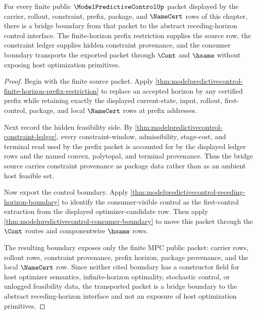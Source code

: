 \begin{theorem}
\label{thm:modelpredictivecontrol-finite-rollout-bridge-boundary}
For every finite public $\ModelPredictiveControlUp$ packet displayed by the
carrier, rollout, constraint, prefix, package, and $\NameCert$ rows of this
chapter, there is a bridge boundary from that packet to the abstract
receding-horizon control interface. The finite-horizon prefix restriction
supplies the source row, the constraint ledger supplies hidden constraint
provenance, and the consumer boundary transports the exported packet through
$\Cont$ and $\hsame$ without exposing host optimization primitives.
\end{theorem}
\begin{proof}
Begin with the finite source packet. Apply
\autoref{thm:modelpredictivecontrol-finite-horizon-prefix-restriction} to
replace an accepted horizon by any certified prefix while retaining exactly the
displayed current-state, input, rollout, first-control, package, and local
$\NameCert$ rows at prefix addresses.

Next record the hidden feasibility side. By
\autoref{thm:modelpredictivecontrol-constraint-ledger}, every constraint-window,
admissibility, stage-cost, and terminal read used by the prefix packet is
accounted for by the displayed ledger rows and the named convex, polytopal, and
terminal provenance. Thus the bridge source carries constraint provenance as
package data rather than as an ambient host feasible set.

Now export the control boundary. Apply
\autoref{thm:modelpredictivecontrol-receding-horizon-boundary} to identify the
consumer-visible control as the first-control extraction from the displayed
optimizer-candidate row. Then apply
\autoref{thm:modelpredictivecontrol-consumer-boundary} to move this packet
through the $\Cont$ routes and componentwise $\hsame$ rows.

The resulting boundary exposes only the finite MPC public packet: carrier rows,
rollout rows, constraint provenance, prefix horizon, package provenance, and the
local $\NameCert$ row. Since neither cited boundary has a constructor field for
host optimizer semantics, infinite-horizon optimality, stochastic control, or
unlogged feasibility data, the transported packet is a bridge boundary to the
abstract receding-horizon interface and not an exposure of host optimization
primitives.
\end{proof}

